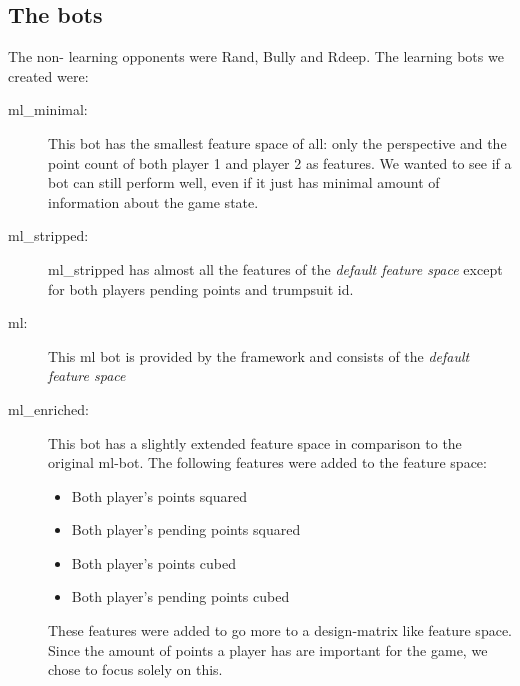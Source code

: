 \documentclass[a4paper,11pt]{article}
\begin{document}
\subsection{The bots}
The non- learning opponents were Rand, Bully and Rdeep. The learning bots we created were:
\begin{description}
\item [ml\_minimal:] This bot has the smallest feature space of all: only the perspective and the point count of both player 1 and player 2 as features. We wanted to see if a bot can still perform well, even if it just has minimal amount of information about the game state.

\item [ml\_stripped:] ml\_stripped has almost all the features of the \textit{default feature space} except for both players pending points and trumpsuit id.

\item [ml:] This ml bot is provided by the framework and consists of the  \textit{default feature space} 

\item [ml\_enriched:]  This bot has a slightly extended feature space in comparison to the original ml-bot. The following features were added to the feature space:
\begin{itemize}
\item Both player's points squared
\item Both player's pending points squared
\item Both player's points cubed
\item Both player's pending points cubed
\end{itemize}
These features were added to go more to a design-matrix like feature space. Since the amount of points a player has are important for the game, we chose to focus solely on this.


\end{description}
\end{document}
